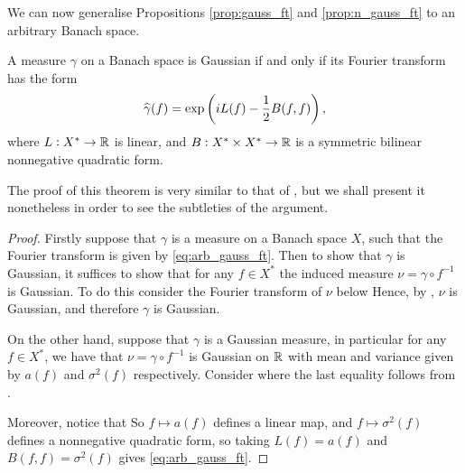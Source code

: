 \documentclass[../main.tex]{subfiles}
\begin{document}
We can now generalise Propositions \ref{prop:gauss_ft} and \ref{prop:n_gauss_ft} to an arbitrary Banach space.

\begin{theorem}
\label{the:arb_gauss_ft}
A measure $\gamma$ on a Banach space is Gaussian if and only if its Fourier transform has the form 
\begin{equation}
    \label{eq:arb_gauss_ft}
    \widehat{\gamma}(f) = \exp\left( iL(f)- \frac12 B(f,f) \right),
\end{equation} where $L:X^*\to\operatorname{\mathbb{R}}$ is linear, and $B:X^*\times X^*\to\operatorname{\mathbb{R}}$ is a symmetric bilinear nonnegative quadratic form.
\end{theorem}
The proof of this theorem is very similar to that of , but we shall present it nonetheless in order to see the subtleties of the argument.
\begin{proof}
Firstly suppose that $\gamma$ is a measure on a Banach space $X$, such that the Fourier transform is given by \eqref{eq:arb_gauss_ft}. Then to show that $\gamma$ is Gaussian, it suffices to show that for any $f\in X^*$ the induced measure $\nu = \gamma\circ f^{-1}$ is Gaussian. To do this consider the Fourier transform of $\nu$ below  Hence, by , $\nu$ is Gaussian, and therefore $\gamma$ is Gaussian.

On the other hand, suppose that $\gamma$ is a Gaussian measure, in particular for any $f\in X^*$, we have that $\nu = \gamma\circ f^{-1}$ is Gaussian on $\operatorname{\mathbb{R}}$ with mean and variance given by $a(f)$ and $\sigma^2(f)$ respectively. Consider  where the last equality follows from .

Moreover, notice that  So $f\mapsto a(f)$ defines a linear map, and $f\mapsto \sigma^2(f)$ defines a nonnegative quadratic form, so taking $L(f) = a(f)$ and $B(f,f) = \sigma^2(f)$ gives \eqref{eq:arb_gauss_ft}.
\end{proof}
\end{document}
